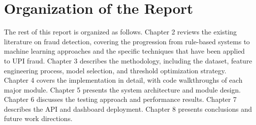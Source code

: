 \section{Organization of the Report}

The rest of this report is organized as follows. Chapter 2 reviews the existing literature on fraud detection, covering the progression from rule-based systems to machine learning approaches and the specific techniques that have been applied to UPI fraud. Chapter 3 describes the methodology, including the dataset, feature engineering process, model selection, and threshold optimization strategy. Chapter 4 covers the implementation in detail, with code walkthroughs of each major module. Chapter 5 presents the system architecture and module design. Chapter 6 discusses the testing approach and performance results. Chapter 7 describes the API and dashboard deployment. Chapter 8 presents conclusions and future work directions.
